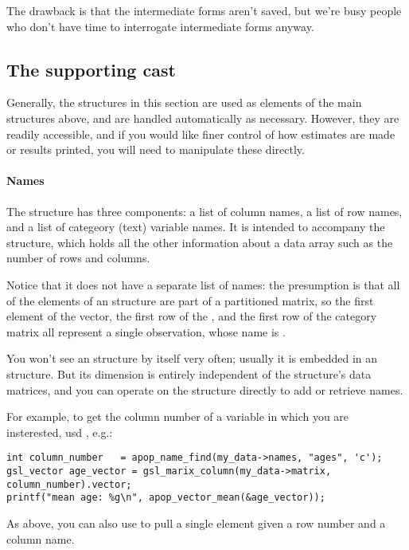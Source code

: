 The drawback is that the intermediate forms aren't saved, but we're busy
people who don't have time to interrogate intermediate forms anyway.

\subsection{\treesymbol{} The supporting cast}
Generally, the structures in this section are used as elements of the main
structures above, and are handled automatically as necessary. However,
they are readily accessible, and if you would like finer control of how
estimates are made or results printed, you will need to manipulate these
directly.

\paragraph{Names}
The  structure has three components: a list of column
names, a list of row names, and a list of categeory (text) variable
names. It is intended to accompany the  structure,
which holds all the other information about a data array such as the
number of rows and columns. 

Notice that it does not have a separate list of names: the presumption
is that all of the elements of an  structure are part
of a partitioned matrix, so the first element of the vector, the first
row of the , and the first row of the category matrix all represent a single observation, whose name is .

You won't see an  structure by itself very often;
usually it is embedded in an  structure. But its
dimension is entirely independent of the  structure's
data matrices, and you can operate on the  structure
directly to add or retrieve names.

For example, to get the
column number of a variable in which you are insterested, usd , e.g.:
\begin{lstlisting}
int column_number   = apop_name_find(my_data->names, "ages", 'c');
gsl_vector age_vector = gsl_marix_column(my_data->matrix, column_number).vector;
printf("mean age: %g\n", apop_vector_mean(&age_vector));
\end{lstlisting}
As above, you can also use  to pull a single
element given a row number and a column name.

